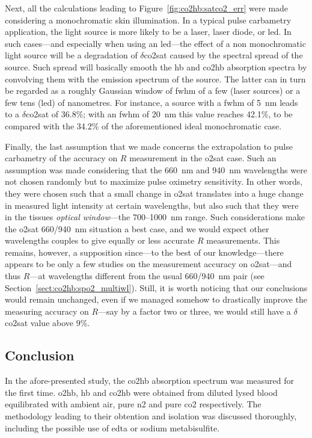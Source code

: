 Next, all the calculations leading to Figure~\ref{fig:co2hb:satco2_err} were made considering a monochromatic skin illumination. In a typical pulse carbametry application, the light source is more likely to be a laser, laser diode, or \gls{led}. In such cases---and especially when using an \gls{led}---the effect of a non monochromatic light source will be a degradation of $\delta$\gls{co2sat} caused by the spectral spread of the source. Such spread will basically smooth the \gls{hb} and \gls{co2hb} absorption spectra by convolving them with the emission spectrum of the source. The latter can in turn be regarded as a roughly Gaussian window of \gls{fwhm} of a few (laser sources) or a few tens (\gls{led}) of nanometres. For instance, a source with a \gls{fwhm} of 5~nm leads to a $\delta$\gls{co2sat} of 36.8\%; with an \gls{fwhm} of 20~nm this value reaches 42.1\%, to be compared with the 34.2\% of the aforementioned ideal monochromatic case.

Finally, the last assumption that we made concerns the extrapolation to pulse carbametry of the accuracy on $R$ measurement in the \gls{o2sat} case. Such an assumption was made considering that the 660~nm and 940~nm wavelengths were not chosen randomly but to maximize pulse oximetry sensitivity. In other words, they were chosen such that a small change in \gls{o2sat} translates into a huge change in measured light intensity at certain wavelengths\cite{mook1969, assendelft1970}, but also such that they were in the tissues \emph{optical window}---the 700--1000~nm range\cite{wilson1985, melo2001, ash2017}. Such considerations make the \gls{o2sat} 660/940~nm situation a best case, and we would expect other wavelengths couples to give equally or less accurate $R$ measurements. This remains, however, a supposition since---to the best of our knowledge---there appears to be only a few studies on the measurement accuracy on \gls{o2sat}---and thus $R$---at wavelengths different from the usual 660/940~nm pair (see Section~\ref{sect:co2hb:spo2_multiwl}). Still, it is worth noticing that our conclusions would remain unchanged, even if we managed somehow to drastically improve the measuring accuracy on $R$---say by a factor two or three, we would still have a $\delta$\gls{co2sat} value above 9\%.

\subsection{Conclusion}

In the afore-presented study, the \gls{co2hb} absorption spectrum was measured for the first time. \gls{o2hb}, \gls{hb} and \gls{co2hb} were obtained from diluted lysed blood equilibrated with ambient air, pure \gls{n2} and pure \gls{co2} respectively. The methodology leading to their obtention and isolation was discussed thoroughly, including the possible use of \gls{edta} or sodium metabisulfite.

